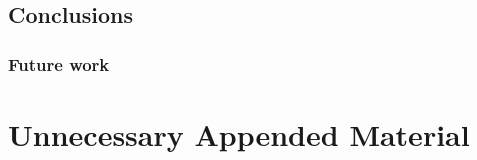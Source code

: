 \documentclass{kththesis}
\begin{document}
\section{Conclusions}



\subsection{Future work}



\printbibliography[heading=bibintoc] 

\appendix

\chapter{Unnecessary Appended Material}
\end{document}
